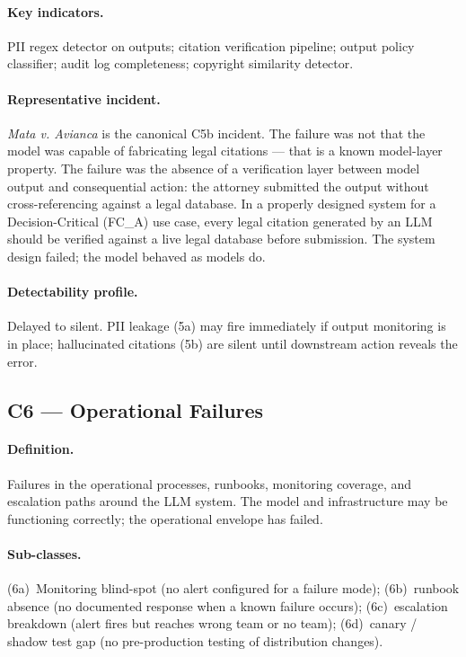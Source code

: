 \documentclass{article}
\begin{document}
\paragraph{Key indicators.}
PII regex detector on outputs; citation verification pipeline; output
policy classifier; audit log completeness; copyright similarity detector.

\paragraph{Representative incident.}
\emph{Mata v. Avianca} \citep{mata2023avianca} is the canonical C5b incident.
The failure was not that the model was capable of fabricating legal citations ---
that is a known model-layer property.  The failure was the absence of a
verification layer between model output and consequential action: the attorney
submitted the output without cross-referencing against a legal database.
In a properly designed system for a Decision-Critical (FC\_A) use case,
every legal citation generated by an LLM should be verified against a live
legal database before submission.  The system design failed; the model
behaved as models do.

\paragraph{Detectability profile.}
Delayed to silent.  PII leakage (5a) may fire immediately if output monitoring
is in place; hallucinated citations (5b) are silent until downstream action
reveals the error.

\subsection{C6 --- Operational Failures}

\paragraph{Definition.}
Failures in the operational processes, runbooks, monitoring coverage, and
escalation paths around the LLM system.  The model and infrastructure may be
functioning correctly; the operational envelope has failed.

\paragraph{Sub-classes.}
(6a)~Monitoring blind-spot (no alert configured for a failure mode);
(6b)~runbook absence (no documented response when a known failure occurs);
(6c)~escalation breakdown (alert fires but reaches wrong team or no team);
(6d)~canary / shadow test gap (no pre-production testing of distribution
changes).
\end{document}
